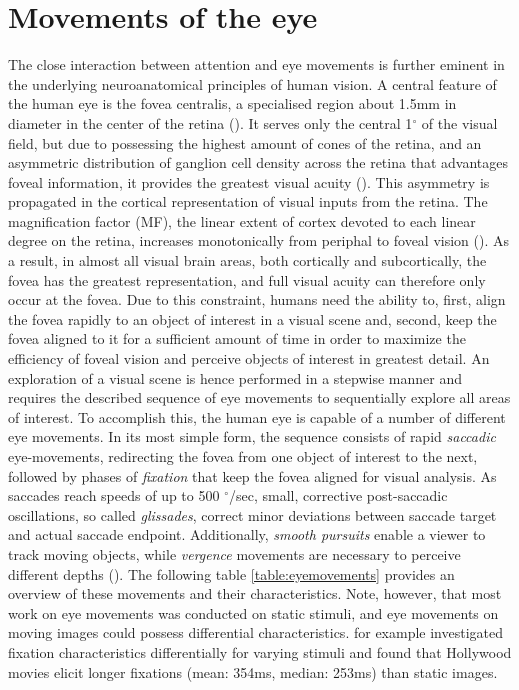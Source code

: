\documentclass[a4paper, 12pt]{scrreprt}
\begin{document}
\section{Movements of the eye}\label{section:eyemoves}
The close interaction between attention and eye movements is further eminent in the underlying neuroanatomical principles of human vision. A central feature of the human eye is the fovea centralis, a specialised region about 1.5mm in diameter in the center of the retina (\cite{benninghof2004anat}). It serves only the central 1$^\circ$ of the visual field, but due to possessing the highest amount of cones of the retina, and an asymmetric distribution of ganglion cell density across the retina that advantages foveal information, it provides the greatest visual acuity (\cite{perry1986ganglion}). This asymmetry is propagated in the cortical representation of visual inputs from the retina. The magnification factor (MF), the linear extent of cortex devoted to each linear degree on the retina, increases monotonically from periphal to foveal vision (\cite{daniel1961representation}). As a result, in almost all visual brain areas, both cortically and subcortically, the fovea has the greatest representation, and full visual acuity can therefore only occur at the fovea. 
Due to this constraint, humans need the ability to, first, align the fovea rapidly to an object of interest in a visual scene and, second, keep the fovea aligned to it for a sufficient amount of time in order to maximize the efficiency of foveal vision and perceive objects of interest in greatest detail. An exploration of a visual scene is hence performed in a stepwise manner and requires the described sequence of eye movements to sequentially explore all areas of interest. To accomplish this, the human eye is capable of a number of different eye movements. In its most simple form, the sequence consists of rapid \textit{saccadic} eye-movements, redirecting the fovea from one object of interest to the next, followed by phases of \textit{fixation} that keep the fovea aligned for visual analysis. As saccades reach speeds of up to 500 $^\circ$/sec, small, corrective post-saccadic oscillations, so called \textit{glissades}, correct minor deviations between saccade target and actual saccade endpoint. Additionally, \textit{smooth pursuits} enable a viewer to track moving objects, while \textit{vergence} movements are necessary to perceive different depths (\cite{holmqvist2011eye}). The following table \ref{table:eyemovements} provides an overview of these movements and their characteristics. Note, however, that most work on eye movements was conducted on static stimuli, and eye movements on moving images could possess differential characteristics. \textcite{dorr2010variability} for example investigated fixation characteristics differentially for varying stimuli and found that Hollywood movies elicit longer fixations (mean: 354ms, median: 253ms) than static images. \newline
\end{document}
